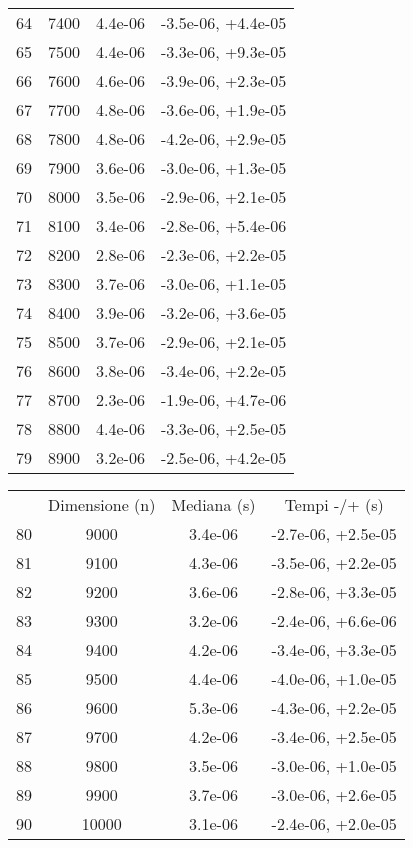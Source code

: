 \begin{table}
\begin{adjustbox}{width=1\textwidth/2}
\begin{tabular}{|c|c|c|c|}
\cline{1-4}
64 & 7400 & 4.4e-06 & -3.5e-06, +4.4e-05 \\
\cline{1-4}
65 & 7500 & 4.4e-06 & -3.3e-06, +9.3e-05 \\
\cline{1-4}
66 & 7600 & 4.6e-06 & -3.9e-06, +2.3e-05 \\
\cline{1-4}
67 & 7700 & 4.8e-06 & -3.6e-06, +1.9e-05 \\
\cline{1-4}
68 & 7800 & 4.8e-06 & -4.2e-06, +2.9e-05 \\
\cline{1-4}
69 & 7900 & 3.6e-06 & -3.0e-06, +1.3e-05 \\
\cline{1-4}
70 & 8000 & 3.5e-06 & -2.9e-06, +2.1e-05 \\
\cline{1-4}
71 & 8100 & 3.4e-06 & -2.8e-06, +5.4e-06 \\
\cline{1-4}
72 & 8200 & 2.8e-06 & -2.3e-06, +2.2e-05 \\
\cline{1-4}
73 & 8300 & 3.7e-06 & -3.0e-06, +1.1e-05 \\
\cline{1-4}
74 & 8400 & 3.9e-06 & -3.2e-06, +3.6e-05 \\
\cline{1-4}
75 & 8500 & 3.7e-06 & -2.9e-06, +2.1e-05 \\
\cline{1-4}
76 & 8600 & 3.8e-06 & -3.4e-06, +2.2e-05 \\
\cline{1-4}
77 & 8700 & 2.3e-06 & -1.9e-06, +4.7e-06 \\
\cline{1-4}
78 & 8800 & 4.4e-06 & -3.3e-06, +2.5e-05 \\
\cline{1-4}
79 & 8900 & 3.2e-06 & -2.5e-06, +4.2e-05 \\
\cline{1-4}
\end{tabular}
\end{adjustbox}
\end{table}

\begin{table}
\centering
\begin{adjustbox}{width=1\textwidth/2}
\begin{tabular}{|c|c|c|c|}
\hline
 & Dimensione (n) & Mediana (s) & Tempi -/+ (s) \\
80 & 9000 & 3.4e-06 & -2.7e-06, +2.5e-05 \\
\cline{1-4}
81 & 9100 & 4.3e-06 & -3.5e-06, +2.2e-05 \\
\cline{1-4}
82 & 9200 & 3.6e-06 & -2.8e-06, +3.3e-05 \\
\cline{1-4}
83 & 9300 & 3.2e-06 & -2.4e-06, +6.6e-06 \\
\cline{1-4}
84 & 9400 & 4.2e-06 & -3.4e-06, +3.3e-05 \\
\cline{1-4}
85 & 9500 & 4.4e-06 & -4.0e-06, +1.0e-05 \\
\cline{1-4}
86 & 9600 & 5.3e-06 & -4.3e-06, +2.2e-05 \\
\cline{1-4}
87 & 9700 & 4.2e-06 & -3.4e-06, +2.5e-05 \\
\cline{1-4}
88 & 9800 & 3.5e-06 & -3.0e-06, +1.0e-05 \\
\cline{1-4}
89 & 9900 & 3.7e-06 & -3.0e-06, +2.6e-05 \\
\cline{1-4}
90 & 10000 & 3.1e-06 & -2.4e-06, +2.0e-05 \\
\cline{1-4}
\end{tabular}
\end{adjustbox}
\end{table}
